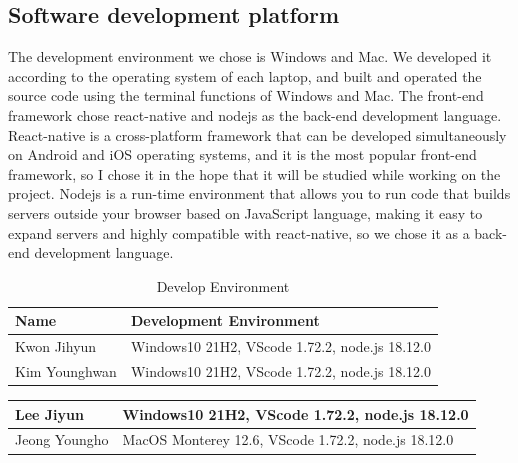 \documentclass[conference]{IEEEtran}
\begin{document}
\subsection{Software development platform}
The development environment we chose is Windows and Mac. We developed it according to the operating system of each laptop, and built and operated the source code using the terminal functions of Windows and Mac. The front-end framework chose react-native and nodejs as the back-end development language. React-native is a cross-platform framework that can be developed simultaneously on Android and iOS operating systems, and it is the most popular front-end framework, so I chose it in the hope that it will be studied while working on the project. Nodejs is a run-time environment that allows you to run code that builds servers outside your browser based on JavaScript language, making it easy to expand servers and highly compatible with react-native, so we chose it as a back-end development language.\\
\begin{table}[h]
\caption{Develop Environment}
\def\arraystretch{1.25} \small
    \begin{tabular}{|p{2.4cm}|p{5.0cm}|}
	\hline
	Name & Development Environment\\
       \hline
       Kwon Jihyun & Windows10 21H2, VScode 1.72.2, node.js 18.12.0 \\
	\hline
        Kim Younghwan & Windows10 21H2, VScode 1.72.2, node.js 18.12.0\\
	\hline
	\end{tabular}
\end{table}
\begin{table}
\def\arraystretch{1.25} \small
    \begin{tabular}{|p{2.4cm}|p{5.0cm}|}
	\hline
        Lee Jiyun & Windows10 21H2, VScode 1.72.2, node.js 18.12.0\\
	\hline
	Jeong Youngho & MacOS Monterey 12.6, VScode 1.72.2, node.js 18.12.0\\
	\hline
	\end{tabular}
\end{table}
\end{document}
